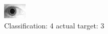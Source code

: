 \begin{figure}[h!]
\begin{center}
\includegraphics[width=0.60\columnwidth]{figures/ID1964_class_4_target_3.png}
\end{center}
\caption{ Classification: 4 actual target: 3}
\label{fig:ID1964_class_4_target_3}
\end{figure}
